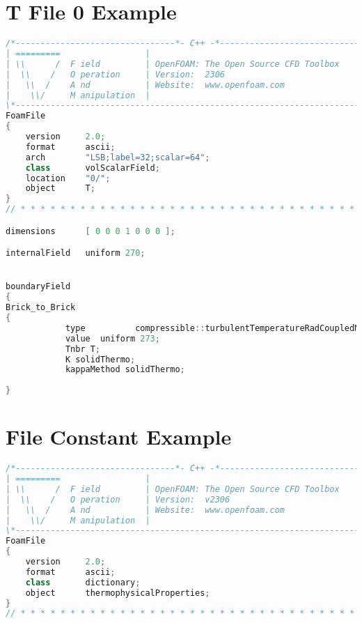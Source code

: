 \begin{theappendices}
\chapter{T File 0 Example}
\begin{lstlisting}[language=c++, caption=OF text file in 0/Brick/T]
/*--------------------------------*- C++ -*----------------------------------*\
| =========                 |                                                 |
| \\      /  F ield         | OpenFOAM: The Open Source CFD Toolbox           |
|  \\    /   O peration     | Version:  2306                                  |
|   \\  /    A nd           | Website:  www.openfoam.com                      |
|    \\/     M anipulation  |                                                 |
\*---------------------------------------------------------------------------*/
FoamFile
{
    version     2.0;
    format      ascii;
    arch        "LSB;label=32;scalar=64";
    class       volScalarField;
    location    "0/";
    object      T;
}
// * * * * * * * * * * * * * * * * * * * * * * * * * * * * * * * * * * * * * //

dimensions      [ 0 0 0 1 0 0 0 ];

internalField   uniform 270;


boundaryField
{
Brick_to_Brick
{
            type          compressible::turbulentTemperatureRadCoupledMixed;
            value  uniform 273;
            Tnbr T;
            K solidThermo;
            kappaMethod solidThermo;
            
}
\end{lstlisting}




\singlespacing
\chapter{File Constant Example}
\begin{lstlisting}[language=c++, caption=OF text file in constant/Brick/thermophysicalproperties]
/*--------------------------------*- C++ -*----------------------------------*\
| =========                 |                                                 |
| \\      /  F ield         | OpenFOAM: The Open Source CFD Toolbox           |
|  \\    /   O peration     | Version:  v2306                                 |
|   \\  /    A nd           | Website:  www.openfoam.com                      |
|    \\/     M anipulation  |                                                 |
\*---------------------------------------------------------------------------*/
FoamFile
{
    version     2.0;
    format      ascii;
    class       dictionary;
    object      thermophysicalProperties;
}
// * * * * * * * * * * * * * * * * * * * * * * * * * * * * * * * * * * * * * //


\end{lstlisting}
\end{theappendices}
